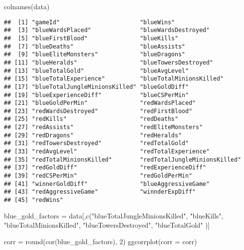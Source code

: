 \documentclass[
]{article}
\newenvironment{Shaded}{\begin{snugshade}}{\end{snugshade}}
\newcommand{\AttributeTok}[1]{\textcolor[rgb]{0.77,0.63,0.00}{#1}}
\newcommand{\DecValTok}[1]{\textcolor[rgb]{0.00,0.00,0.81}{#1}}
\newcommand{\FunctionTok}[1]{\textcolor[rgb]{0.00,0.00,0.00}{#1}}
\newcommand{\NormalTok}[1]{#1}
\newcommand{\OtherTok}[1]{\textcolor[rgb]{0.56,0.35,0.01}{#1}}
\newcommand{\StringTok}[1]{\textcolor[rgb]{0.31,0.60,0.02}{#1}}
\begin{document}
\begin{Shaded}
\begin{Highlighting}[]
\FunctionTok{colnames}\NormalTok{(data)}
\end{Highlighting}
\end{Shaded}

\begin{verbatim}
##  [1] "gameId"                       "blueWins"                    
##  [3] "blueWardsPlaced"              "blueWardsDestroyed"          
##  [5] "blueFirstBlood"               "blueKills"                   
##  [7] "blueDeaths"                   "blueAssists"                 
##  [9] "blueEliteMonsters"            "blueDragons"                 
## [11] "blueHeralds"                  "blueTowersDestroyed"         
## [13] "blueTotalGold"                "blueAvgLevel"                
## [15] "blueTotalExperience"          "blueTotalMinionsKilled"      
## [17] "blueTotalJungleMinionsKilled" "blueGoldDiff"                
## [19] "blueExperienceDiff"           "blueCSPerMin"                
## [21] "blueGoldPerMin"               "redWardsPlaced"              
## [23] "redWardsDestroyed"            "redFirstBlood"               
## [25] "redKills"                     "redDeaths"                   
## [27] "redAssists"                   "redEliteMonsters"            
## [29] "redDragons"                   "redHeralds"                  
## [31] "redTowersDestroyed"           "redTotalGold"                
## [33] "redAvgLevel"                  "redTotalExperience"          
## [35] "redTotalMinionsKilled"        "redTotalJungleMinionsKilled" 
## [37] "redGoldDiff"                  "redExperienceDiff"           
## [39] "redCSPerMin"                  "redGoldPerMin"               
## [41] "winnerGoldDiff"               "blueAggressiveGame"          
## [43] "redAggressiveGame"            "winnderExpDiff"              
## [45] "redWins"
\end{verbatim}

\begin{Shaded}
\begin{Highlighting}[]
\NormalTok{blue\_gold\_factors }\OtherTok{=}\NormalTok{ data[,}\FunctionTok{c}\NormalTok{(}\StringTok{"blueTotalJungleMinionsKilled"}\NormalTok{, }
                            \StringTok{"blueKills"}\NormalTok{,}
                            \StringTok{"blueTotalMinionsKilled"}\NormalTok{,}
                            \StringTok{"blueTowersDestroyed"}\NormalTok{,}
                            \StringTok{"blueTotalGold"}
\NormalTok{                            )]}

\NormalTok{corr }\OtherTok{=} \FunctionTok{round}\NormalTok{(}\FunctionTok{cor}\NormalTok{(blue\_gold\_factors), }\DecValTok{2}\NormalTok{)}
\FunctionTok{ggcorrplot}\NormalTok{(}\AttributeTok{corr =}\NormalTok{ corr)}
\end{Highlighting}
\end{Shaded}
\end{document}
